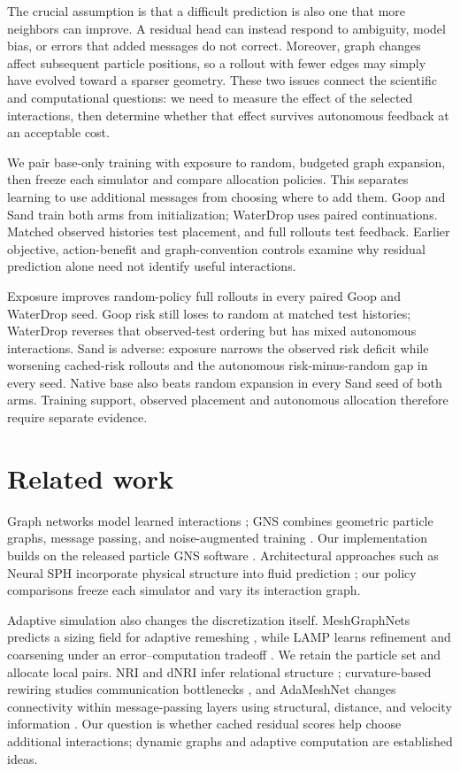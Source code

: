 The crucial assumption is that a difficult prediction is also one that more neighbors can improve. A residual head can instead respond to ambiguity, model bias, or errors that added messages do not correct. Moreover, graph changes affect subsequent particle positions, so a rollout with fewer edges may simply have evolved toward a sparser geometry. These two issues connect the scientific and computational questions: we need to measure the effect of the selected interactions, then determine whether that effect survives autonomous feedback at an acceptable cost.

We pair base-only training with exposure to random, budgeted graph expansion, then freeze each simulator and compare allocation policies. This separates learning to use additional messages from choosing where to add them. Goop and Sand train both arms from initialization; WaterDrop uses paired continuations. Matched observed histories test placement, and full rollouts test feedback. Earlier objective, action-benefit and graph-convention controls examine why residual prediction alone need not identify useful interactions.

Exposure improves random-policy full rollouts in every paired Goop and WaterDrop seed. Goop risk still loses to random at matched test histories; WaterDrop reverses that observed-test ordering but has mixed autonomous interactions. Sand is adverse: exposure narrows the observed risk deficit while worsening cached-risk rollouts and the autonomous risk-minus-random gap in every seed. Native base also beats random expansion in every Sand seed of both arms. Training support, observed placement and autonomous allocation therefore require separate evidence.

\section{Related work}
Graph networks model learned interactions \citep{battaglia2016}; GNS combines geometric particle graphs, message passing, and noise-augmented training \citep{sanchez2020}. Our implementation builds on the released particle GNS software \citep{kumar2023}. Architectural approaches such as Neural SPH incorporate physical structure into fluid prediction \citep{toshev2024}; our policy comparisons freeze each simulator and vary its interaction graph.

Adaptive simulation also changes the discretization itself. MeshGraphNets predicts a sizing field for adaptive remeshing \citep{pfaff2021}, while LAMP learns refinement and coarsening under an error--computation tradeoff \citep{wu2023}. We retain the particle set and allocate local pairs. NRI and dNRI infer relational structure \citep{kipf2018,graber2020}; curvature-based rewiring studies communication bottlenecks \citep{topping2022}, and AdaMeshNet changes connectivity within message-passing layers using structural, distance, and velocity information \citep{seo2025}. Our question is whether cached residual scores help choose additional interactions; dynamic graphs and adaptive computation are established ideas.

